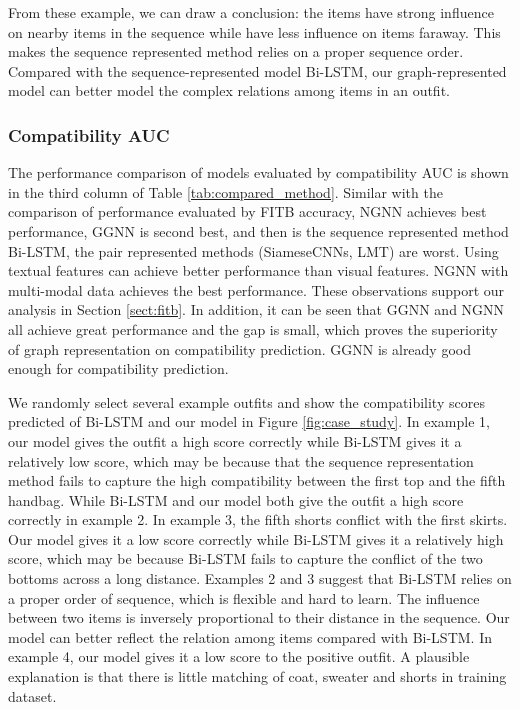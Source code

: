 \documentclass[sigconf]{acmart}
\begin{document}
From these example, we can draw a conclusion: the items have strong influence on nearby items in the sequence while have less influence on items faraway. This makes the sequence represented method relies on a proper sequence order.
	Compared with the sequence-represented model Bi-LSTM, our graph-represented model can better model the complex relations among items in an outfit.



\subsubsection{Compatibility AUC}
The performance comparison of models evaluated by compatibility AUC is shown in the third column of Table \ref{tab:compared_method}.
Similar with the comparison of performance evaluated by FITB accuracy, NGNN achieves best performance, GGNN is second best, and then is the sequence represented method Bi-LSTM, the pair represented methods (SiameseCNNs, LMT) are worst. Using textual features can achieve better performance than visual features. NGNN with multi-modal data achieves the best performance. These observations support our analysis in Section \ref{sect:fitb}.
In addition, it can be seen that GGNN and NGNN all achieve great performance and the gap is small, which proves the superiority of graph representation on compatibility prediction.
GGNN is already good enough for compatibility prediction.


We randomly select several example outfits and show the compatibility scores predicted of Bi-LSTM and our model in Figure \ref{fig:case_study}.
In example 1, our model gives the outfit a high score correctly while Bi-LSTM gives it a relatively low score, which may be because that the sequence representation method fails to capture the high compatibility between the first top and the fifth handbag.
While Bi-LSTM and our model both give the outfit a high score correctly in example 2.
In example 3, the fifth shorts conflict with the first skirts. Our model gives it a low score correctly while Bi-LSTM gives it a relatively high score, which may be because Bi-LSTM fails to capture the conflict of the two bottoms across a long distance. Examples 2 and 3 suggest that Bi-LSTM relies on a proper order of sequence, which is flexible and hard to learn. The influence between two items is inversely proportional to their distance in the sequence. Our model can better reflect the relation among items compared with Bi-LSTM.
In example 4, our model gives it a low score to the positive outfit. A plausible explanation is that there is little matching of coat, sweater and shorts in training dataset.
\end{document}
